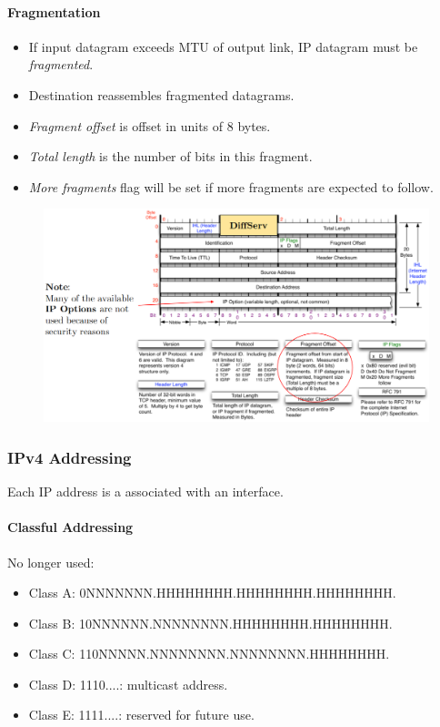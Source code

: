 \documentclass[twocolumn,english]{article}
\begin{document}
\paragraph{Fragmentation}
\begin{itemize}
\item If input datagram exceeds MTU of output link, IP datagram must be
\emph{fragmented}.
\item Destination reassembles fragmented datagrams.
\item \emph{Fragment offset} is offset in units of 8 bytes.
\item \emph{Total length} is the number of bits in this fragment.
\item \emph{More fragments} flag will be set if more fragments are expected
to follow.
\end{itemize}
\begin{figure}[H]
\centering{}\includegraphics[width=0.95\linewidth]{img/ip}
\end{figure}

\subsubsection{IPv4 Addressing}

Each IP address is a associated with an interface.

\paragraph{Classful Addressing}

No longer used:
\begin{itemize}
\item Class A: 0NNNNNNN.HHHHHHHH.HHHHHHHH.HHHHHHHH.
\item Class B: 10NNNNNN.NNNNNNNN.HHHHHHHH.HHHHHHHH.
\item Class C: 110NNNNN.NNNNNNNN.NNNNNNNN.HHHHHHHH.
\item Class D: 1110....: multicast address.
\item Class E: 1111....: reserved for future use.
\end{itemize}
\end{document}
